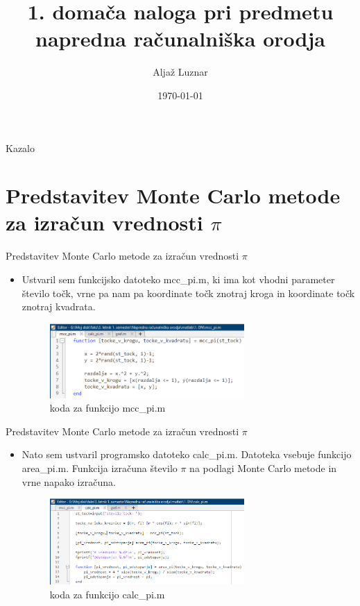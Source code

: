 \documentclass{beamer}
\title{1. domača naloga pri predmetu napredna računalniška orodja}
\author{Aljaž Luznar}
\institute{Univerza v ljubljani Fakulteta za strojništvo}
\date{\today}
\begin{document}
\frame{\titlepage}

\begin{frame}{Kazalo}
    \tableofcontents
\end{frame}


\section{Predstavitev Monte Carlo metode za izračun vrednosti $\pi$}
\begin{frame}{Predstavitev Monte Carlo metode za izračun vrednosti $\pi$}
    \begin{itemize}
        \item Ustvaril sem funkcijsko datoteko mcc\_pi.m, ki ima kot vhodni parameter število točk, vrne pa nam pa koordinate točk znotraj kroga in koordinate točk znotraj kvadrata.
    \begin{figure}
        \includegraphics[width=0.7\textwidth]{Posnetek zaslona 2023-10-22 162922.png}
        \caption{koda za funkcijo mcc\_pi.m}
    \end{figure}

    \end{itemize}
\end{frame}
\begin{frame}{Predstavitev Monte Carlo metode za izračun vrednosti $\pi$}
    \begin{itemize}
        \item Nato sem ustvaril programsko datoteko calc\_pi.m. Datoteka vsebuje funkcijo area\_pi.m. Funkcija izračuna število $\pi$ na podlagi Monte Carlo metode in vrne napako izračuna.
    \begin{figure}
        \includegraphics[width=0.7\textwidth]{Posnetek zaslona 2023-10-22 163758.png}
        \caption{koda za funkcijo calc\_pi.m}
    \end{figure}

    \end{itemize}
\end{frame}
\end{document}
